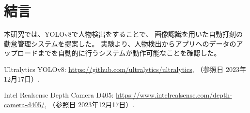 \documentclass[10pt]{jarticle}
\begin{document}

    \section{結\hspace{2zw}言}%
本研究では、YOLOv8で人物検出をすることで、
画像認識を用いた自動打刻の勤怠管理システムを提案した。
実験より、人物検出からアプリへのデータのアップロードまでを自動的に行うシステムが動作可能なことを確認した。

    \vspace{5truemm}
    {\footnotesize
        \begin{thebibliography}{99}

            Ultralytics YOLOv8: 
            \url{https://github.com/ultralytics/ultralytics}, 
            （参照日 2023年12月17日）.

            Intel Realsense Depth Camera D405: 
            \url{https://www.intelrealsense.com/depth-camera-d405/}, 
            （参照日 2023年12月17日）.

        \end{thebibliography}
    }
    \normalsize
\end{document}
